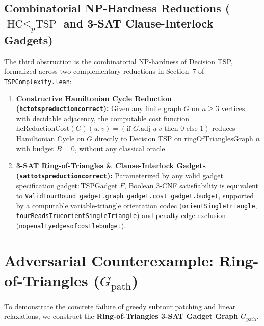 \documentclass[11pt,a4paper]{article}
\renewcommand{\_}{\origunderscore\allowbreak}
\theoremstyle{plain}
\theoremstyle{definition}
\theoremstyle{remark}
\begin{document}
\subsection{Combinatorial NP-Hardness Reductions (\texorpdfstring{$\text{HC} \le_p \text{TSP}$}{HC <=p TSP} and 3-SAT Clause-Interlock Gadgets)}
The third obstruction is the combinatorial NP-hardness of Decision TSP, formalized across two complementary reductions in Section~7 of \texttt{TSP\allowbreak Complexity.\allowbreak lean}:
\begin{enumerate}
  \item \textbf{Constructive Hamiltonian Cycle Reduction (\texttt{hc\_to\_tsp\_reduction\_correct}):} Given any finite graph $G$ on $n \ge 3$ vertices with decidable adjacency, the computable cost function $\text{hcReductionCost}(G)(u, v) = (\text{if } G.\text{adj } u\ v \text{ then } 0 \text{ else } 1)$ reduces Hamiltonian Cycle on $G$ directly to Decision TSP on $\text{ringOfTrianglesGraph } n$ with budget $B = 0$, without any classical oracle.
  \item \textbf{3-SAT Ring-of-Triangles \& Clause-Interlock Gadgets (\texttt{sat\_to\_tsp\_reduction\_correct}):} Parameterized by any valid gadget specification $\text{gadget} : \text{TSPGadget } F$, Boolean 3-CNF satisfiability is equivalent to \texttt{ValidTourBound gadget.graph gadget.cost gadget.budget}, supported by a computable variable-triangle orientation codec (\texttt{orient\allowbreak Single\allowbreak Triangle}, \texttt{tourReadsTrue\_orientSingleTriangle}) and penalty-edge exclusion (\texttt{no\_penalty\_edges\_of\_cost\_le\_budget}).
\end{enumerate}

\section{Adversarial Counterexample: Ring-of-Triangles (\texorpdfstring{$G_{\text{path}}$}{G\_path})}

To demonstrate the concrete failure of greedy subtour patching and linear relaxations, we construct the \textbf{Ring-of-Triangles 3-SAT Gadget Graph} $G_{\text{path}}$.
\end{document}
